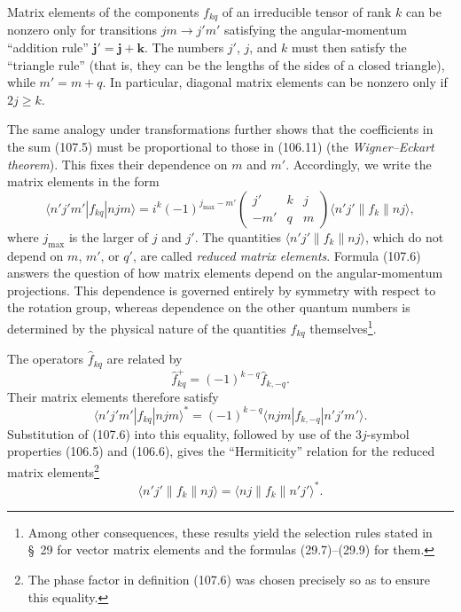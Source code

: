 Matrix elements of the components $f_{kq}$ of an irreducible tensor of rank $k$ can be nonzero only for transitions $jm\to j'm'$ satisfying the angular-momentum ``addition rule'' $\mathbf j'=\mathbf j+\mathbf k$. The numbers $j'$, $j$, and $k$ must then satisfy the ``triangle rule'' (that is, they can be the lengths of the sides of a closed triangle), while $m'=m+q$. In particular, diagonal matrix elements can be nonzero only if $2j\geqslant k$.

The same analogy under transformations further shows that the coefficients in the sum (107.5) must be proportional to those in (106.11) (the \emph{Wigner--Eckart theorem}). This fixes their dependence on $m$ and $m'$. Accordingly, we write the matrix elements in the form
\begin{equation}
 \langle n'j'm'|f_{kq}|njm\rangle=i^k(-1)^{j_{\max}-m'}
 \begin{pmatrix}j'&k&j\\-m'&q&m\end{pmatrix}
 \langle n'j'\|f_k\|nj\rangle,
 \tag{107.6}
\end{equation}
where $j_{\max}$ is the larger of $j$ and $j'$. The quantities $\langle n'j'\|f_k\|nj\rangle$, which do not depend on $m$, $m'$, or $q'$, are called \emph{reduced matrix elements}. Formula (107.6) answers the question of how matrix elements depend on the angular-momentum projections. This dependence is governed entirely by symmetry with respect to the rotation group, whereas dependence on the other quantum numbers is determined by the physical nature of the quantities $f_{kq}$ themselves\footnote{Among other consequences, these results yield the selection rules stated in \S~29 for vector matrix elements and the formulas (29.7)--(29.9) for them.}.

The operators $\widehat f_{kq}$ are related by
\begin{equation}
 \widehat f_{kq}^{+}=(-1)^{k-q}\widehat f_{k,-q}.
 \tag{107.7}
\end{equation}
Their matrix elements therefore satisfy
\begin{equation}
 \langle n'j'm'|f_{kq}|njm\rangle^{*}=(-1)^{k-q}\langle njm|f_{k,-q}|n'j'm'\rangle.
 \tag{107.8}
\end{equation}
Substitution of (107.6) into this equality, followed by use of the $3j$-symbol properties (106.5) and (106.6), gives the ``Hermiticity'' relation for the reduced matrix elements\footnote{The phase factor in definition (107.6) was chosen precisely so as to ensure this equality.}
\begin{equation}
 \langle n'j'\|f_k\|nj\rangle=\langle nj\|f_k\|n'j'\rangle^{*}.
 \tag{107.9}
\end{equation}

